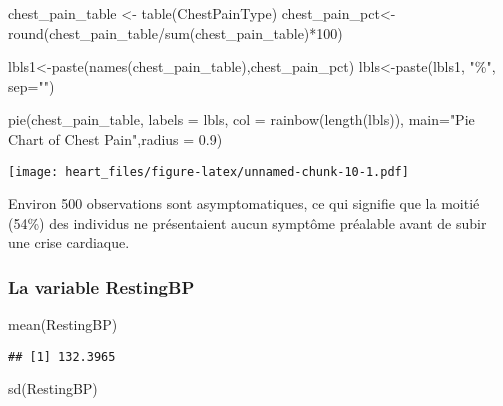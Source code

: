 \documentclass[
]{article}
\newenvironment{Shaded}{\begin{snugshade}}{\end{snugshade}}
\newcommand{\AttributeTok}[1]{\textcolor[rgb]{0.77,0.63,0.00}{#1}}
\newcommand{\DecValTok}[1]{\textcolor[rgb]{0.00,0.00,0.81}{#1}}
\newcommand{\FloatTok}[1]{\textcolor[rgb]{0.00,0.00,0.81}{#1}}
\newcommand{\FunctionTok}[1]{\textcolor[rgb]{0.00,0.00,0.00}{#1}}
\newcommand{\NormalTok}[1]{#1}
\newcommand{\OtherTok}[1]{\textcolor[rgb]{0.56,0.35,0.01}{#1}}
\newcommand{\SpecialCharTok}[1]{\textcolor[rgb]{0.00,0.00,0.00}{#1}}
\newcommand{\StringTok}[1]{\textcolor[rgb]{0.31,0.60,0.02}{#1}}
\begin{document}
\begin{Shaded}
\begin{Highlighting}[]
\NormalTok{chest\_pain\_table }\OtherTok{\textless{}{-}} \FunctionTok{table}\NormalTok{(ChestPainType)}
\NormalTok{chest\_pain\_pct}\OtherTok{\textless{}{-}}\FunctionTok{round}\NormalTok{(chest\_pain\_table}\SpecialCharTok{/}\FunctionTok{sum}\NormalTok{(chest\_pain\_table)}\SpecialCharTok{*}\DecValTok{100}\NormalTok{)}

\NormalTok{lbls1}\OtherTok{\textless{}{-}}\FunctionTok{paste}\NormalTok{(}\FunctionTok{names}\NormalTok{(chest\_pain\_table),chest\_pain\_pct)}
\NormalTok{lbls}\OtherTok{\textless{}{-}}\FunctionTok{paste}\NormalTok{(lbls1, }\StringTok{"\%"}\NormalTok{, }\AttributeTok{sep=}\StringTok{""}\NormalTok{)}

\FunctionTok{pie}\NormalTok{(chest\_pain\_table, }\AttributeTok{labels =}\NormalTok{ lbls, }
    \AttributeTok{col =} \FunctionTok{rainbow}\NormalTok{(}\FunctionTok{length}\NormalTok{(lbls)),}
    \AttributeTok{main=}\StringTok{"Pie Chart of Chest Pain"}\NormalTok{,}\AttributeTok{radius =} \FloatTok{0.9}\NormalTok{)}
\end{Highlighting}
\end{Shaded}

\texttt{[image: heart\_files/figure-latex/unnamed-chunk-10-1.pdf]}

Environ 500 observations sont asymptomatiques, ce qui signifie que la
moitié (54\%) des individus ne présentaient aucun symptôme préalable
avant de subir une crise cardiaque.

\hypertarget{la-variable-restingbp}{%
\subsubsection{\texorpdfstring{La variable
\textbf{RestingBP}}{La variable RestingBP}}\label{la-variable-restingbp}}

\begin{Shaded}
\begin{Highlighting}[]
\FunctionTok{mean}\NormalTok{(RestingBP)}
\end{Highlighting}
\end{Shaded}

\begin{verbatim}
## [1] 132.3965
\end{verbatim}

\begin{Shaded}
\begin{Highlighting}[]
\FunctionTok{sd}\NormalTok{(RestingBP)}
\end{Highlighting}
\end{Shaded}
\end{document}
